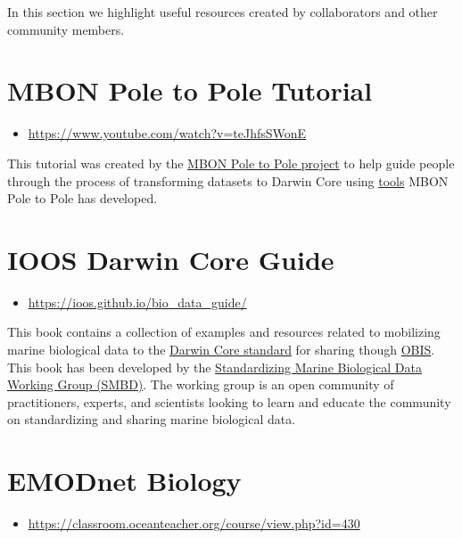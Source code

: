 \documentclass[
  letterpaper,
  DIV=11,
  numbers=noendperiod,
  oneside]{scrreprt}
\providecommand{\tightlist}{%
  \setlength{\itemsep}{0pt}\setlength{\parskip}{0pt}}\usepackage{longtable,booktabs,array}
\begin{document}
In this section we highlight useful resources created by collaborators
and other community members.

\hypertarget{mbon-pole-to-pole-tutorial}{%
\section{MBON Pole to Pole Tutorial}\label{mbon-pole-to-pole-tutorial}}

\begin{itemize}
\tightlist
\item
  \url{https://www.youtube.com/watch?v=teJhfsSWonE}
\end{itemize}

This tutorial was created by the
\href{https://marinebon.org/p2p/index.html}{MBON Pole to Pole project}
to help guide people through the process of transforming datasets to
Darwin Core using
\href{https://marinebon.org/p2p/methods_data_science.html}{tools} MBON
Pole to Pole has developed.

\hypertarget{ioos-darwin-core-guide}{%
\section{IOOS Darwin Core Guide}\label{ioos-darwin-core-guide}}

\begin{itemize}
\tightlist
\item
  \url{https://ioos.github.io/bio_data_guide/}
\end{itemize}

This book contains a collection of examples and resources related to
mobilizing marine biological data to the
\href{https://dwc.tdwg.org/}{Darwin Core standard} for sharing though
\href{https://obis.org/}{OBIS}. This book has been developed by the
\href{https://github.com/ioos/bio_data_guide/blob/main/README.md}{Standardizing
Marine Biological Data Working Group (SMBD)}. The working group is an
open community of practitioners, experts, and scientists looking to
learn and educate the community on standardizing and sharing marine
biological data.

\hypertarget{emodnet-biology}{%
\section{EMODnet Biology}\label{emodnet-biology}}

\begin{itemize}
\tightlist
\item
  \url{https://classroom.oceanteacher.org/course/view.php?id=430}
\end{itemize}
\end{document}
